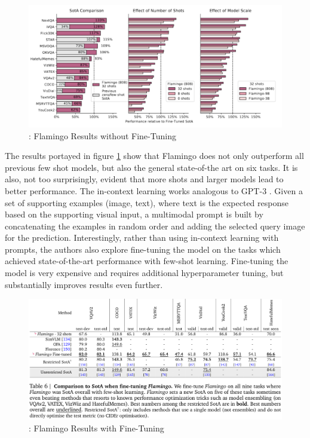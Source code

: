 \documentclass[
]{krantz}
\begin{document}
\begin{figure}

{\centering \includegraphics[width=1\linewidth]{figures/05-chapter2/flamingoresult} 

}

\caption{\citet{alayrac2022flamingo}: Flamingo Results without Fine-Tuning}\label{fig:flamingoresult}
\end{figure}



The results portayed in figure \ref{fig:flamingoresult} show that Flamingo does not only outperform all previous few shot models, but also the general state-of-the art on six tasks. It is also, not too surprisingly, evident that more shots and larger models lead to better performance. The in-context learning works analogous to GPT-3 \citep{brown2020language}. Given a set of supporting examples (image, text), where text is the expected response based on the supporting visual input, a multimodal prompt is built by concatenating the examples in random order and adding the selected query image for the prediction. Interestingly, rather than using in-context learning with prompts, the authors also explore fine-tuning the model on the tasks which achieved state-of-the-art performance with few-shot learning. Fine-tuning the model is very expensive and requires additional hyperparameter tuning, but substantially improves results even further.

\begin{figure}

{\centering \includegraphics[width=1\linewidth]{figures/05-chapter2/flamingofinetune} 

}

\caption{\citet{alayrac2022flamingo}: Flamingo Results with Fine-Tuning}\label{fig:flamingfinetune}
\end{figure}
\end{document}

